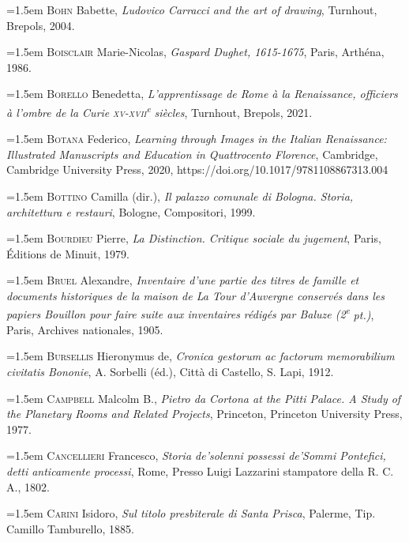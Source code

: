 \documentclass[12pt,twoside,openany]{book}
\newenvironment{PurhBibliography}
  {%
    \par
    \setlength{\parindent}{0pt}%
    \setlength{\leftskip}{0pt}%
  }
  {%
    \par
  }
\begin{document}
\begin{PurhBibliography}
\noindent\hangindent=1.5em \textsc{Bohn} Babette, \textit{Ludovico Carracci and the art of drawing}, Turnhout, Brepols, 2004.\par
\noindent\hangindent=1.5em \textsc{Boisclair} Marie-Nicolas, \textit{Gaspard Dughet, 1615-1675}, Paris, Arthéna, 1986.\par
\noindent\hangindent=1.5em \textsc{Borello} Benedetta, \textit{L’apprentissage de Rome à la Renaissance, officiers à l’ombre de la Curie }\textit{\textsc{xv}}\textit{-}\textit{\textsc{xvii}}\textit{\textsuperscript{e}}\textit{ siècles}, Turnhout, Brepols, 2021.\par
\noindent\hangindent=1.5em \textsc{Botana} Federico, \textit{Learning through Images in the Italian Renaissance: Illustrated Manuscripts and Education in Quattrocento Florence}, Cambridge, Cambridge University Press, 2020, https://doi.org/10.1017/9781108867313.004\par
\noindent\hangindent=1.5em \textsc{Bottino} Camilla (dir.), \textit{Il palazzo comunale di Bologna. Storia, architettura e restauri}, Bologne, Compositori, 1999.\par
\noindent\hangindent=1.5em \textsc{Bourdieu} Pierre, \textit{La Distinction. Critique sociale du jugement}, Paris, Éditions de Minuit, 1979.\par
\noindent\hangindent=1.5em \textsc{Bruel} Alexandre, \textit{Inventaire d’une partie des titres de famille et documents historiques de la maison de La Tour d’Auvergne conservés dans les papiers Bouillon pour faire suite aux inventaires rédigés par Baluze (2}\textit{\textsuperscript{e}}\textit{ pt.)}, Paris, Archives nationales, 1905.\par
\noindent\hangindent=1.5em \textsc{Bursellis} Hieronymus de, \textit{Cronica gestorum ac factorum memorabilium civitatis Bononie}, A. Sorbelli (éd.), Città di Castello, S. Lapi, 1912.\par
\noindent\hangindent=1.5em \textsc{Campbell} Malcolm B., \textit{Pietro da Cortona at the Pitti Palace. A Study of the Planetary Rooms and Related Projects}, Princeton, Princeton University Press, 1977.\par
\noindent\hangindent=1.5em \textsc{Cancellieri} Francesco, \textit{Storia de’solenni possessi de’Sommi Pontefici, detti anticamente processi}, Rome, Presso Luigi Lazzarini stampatore della R. C. A., 1802.\par
\noindent\hangindent=1.5em \textsc{Carini} Isidoro, \textit{Sul titolo presbiterale di Santa Prisca}, Palerme, Tip. Camillo Tamburello, 1885.\par

\end{PurhBibliography}
\end{document}
